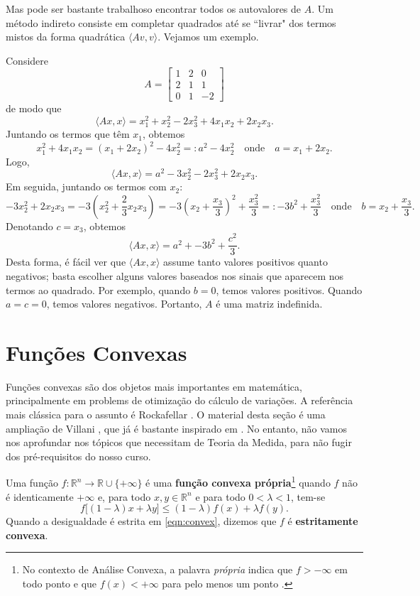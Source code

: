 Mas pode ser bastante trabalhoso encontrar todos os autovalores de $A$. Um método indireto consiste em completar quadrados até se ``livrar" dos termos mistos da forma quadrática $\langle Av, v\rangle$. Vejamos um exemplo.

\begin{ex}
	Considere
	\[
	A = 
	\begin{bmatrix}
	1 & 2 & 0 \\
	2 & 1 & 1 \\
	0 & 1 & -2 
	\end{bmatrix}
	\] de modo que 
	\[
	\langle Ax, x\rangle = x_1^2 + x_2^2 - 2x_3^2 + 4 x_1 x_2 + 2 x_2 x_3.
	\] Juntando os termos que têm $x_1$, obtemos
	\[
	x_1^2 + 4 x_1 x_2 = (x_1 + 2x_2)^2 - 4 x_2^2 =: a^2 - 4x_2^2 \quad \text{onde} \quad a = x_1 + 2x_2.
	\] Logo,
	\[
	\langle Ax, x\rangle = a^2 - 3 x_2^2 - 2x_3^2 + 2 x_2 x_3.
	\] Em seguida, juntando os termos com $x_2$:
	\[
	- 3 x_2^2 + 2 x_2 x_3 = - 3 \left(x_2^2 + \frac{2}{3} x_2 x_3 \right) = - 3 \left(x_2 + \frac{x_3}{3} \right)^2 + \frac{x_3^2}{3} =: -3 b^2 + \frac{x_3^2}{3} \quad \text{onde} \quad b = x_2 + \frac{x_3}{3}.
	\] Denotando $c = x_3$, obtemos
	\[
	\langle Ax, x\rangle = a^2 + -3b^2 + \frac{c^2}{3}.
	\] Desta forma, é fácil ver que $\langle Ax, x\rangle$ assume tanto valores positivos quanto negativos; basta escolher alguns valores baseados nos sinais que aparecem nos termos ao quadrado. Por exemplo, quando $b = 0$, temos valores positivos. Quando $a = c = 0$, temos valores negativos. Portanto, $A$ é uma matriz indefinida.
\end{ex}


\section{Funções Convexas}

Funções convexas são dos objetos mais importantes em matemática, principalmente em problems de otimização do cálculo de variações. A referência mais clássica para o assunto é Rockafellar \cite{Rock-97}. O material desta seção é uma ampliação de Villani \cite[Subseção 2.1.3]{Vill-03}, que já é bastante inspirado em \cite{Rock-97}. No entanto, não vamos nos aprofundar nos tópicos que necessitam de Teoria da Medida, para não fugir dos pré-requisitos do nosso curso.


Uma função $f: \mathbb{R}^n \to \mathbb{R}\cup \{+ \infty\}$ é uma \textbf{função convexa própria}\footnote{No contexto de Análise Convexa, a palavra \textit{própria} indica que $f > - \infty$ em todo ponto e que $f(x) < + \infty$ para pelo menos um ponto \cite[Seção 4]{Rock-97}.} quando $f$ não é identicamente $+ \infty$ e, para todo $x,y \in \mathbb{R}^n$ e para todo $0<\lambda<1$, tem-se
\begin{equation}\label{eqn:convex}
f \big[ (1-\lambda)x + \lambda y \big] \le (1-\lambda) f(x) + \lambda f(y).
\end{equation} Quando a desigualdade é estrita em \eqref{eqn:convex}, dizemos que $f$ é \textbf{estritamente convexa}.

